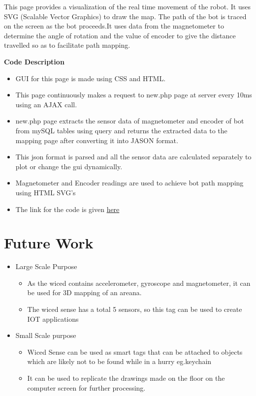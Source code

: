 \documentclass[a4paper,12pt,oneside]{book}
\begin{document}
This page provides a visualization of the real time movement of the robot. It uses SVG (Scalable Vector Graphics) to draw the map. The path of the bot is traced on the screen as the bot proceeds.It uses data from the magnetometer to determine the angle of rotation and the value of encoder to give the distance travelled so as to facilitate path mapping.

 \textbf{Code Description}
        
        \begin{itemize}
        \item GUI for this page is made using CSS and HTML.
        \item This page continuously makes a request to new.php page at server every 10ms using an AJAX call.
        \item new.php page extracts the sensor data of magnetometer and encoder of bot from mySQL tables using query and returns the extracted data to the mapping page after converting it into JASON format.
        \item This json format is parsed and all the sensor data are calculated separately to plot or change the gui dynamically.
        \item Magnetometer and Encoder readings are used to achieve bot path mapping using HTML SVG's
        \item The link for the code is given \href{https://github.com/eYSIP-2016/Wiced-Sense/blob/master/Codes/wiced%20web/javascript/mapping.js}{here}
        \end{itemize}














\newpage
\section{Future Work}
\begin{itemize}
\item{Large Scale Purpose}
\begin{itemize}
\item{As the wiced contains accelerometer, gyroscope and magnetometer, it can be used for 3D mapping of an areana.}
\item{The wiced sense has a total 5 sensors, so this tag can be used to create IOT applications}
\end{itemize}
\item{Small Scale purpose}
\begin{itemize}
\item{Wiced Sense can be used as smart tags that can be attached to objects which are likely not to be found while in a hurry eg.keychain}
\item {It can be used to replicate the drawings made on the floor on the computer screen for further processing.}
\end{itemize}
\end{itemize}
\end{document}
